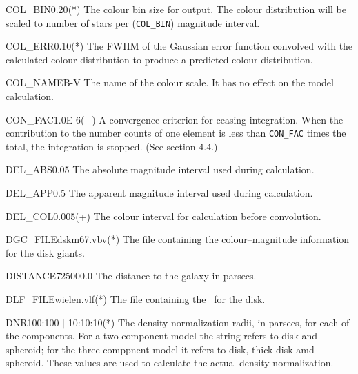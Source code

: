 \begin{key}{COL\_BIN}{0.20}{(*)}
The colour bin size for output. The colour distribution will be scaled to 
number of stars per ({\tt COL\_BIN}) magnitude interval.
\end{key}

\begin{key}{COL\_ERR}{0.10}{(*)}
The FWHM of the Gaussian error function convolved with the 
calculated colour distribution to produce a predicted colour distribution.
\end{key}

\begin{key}{COL\_NAME}{B-V}{}
The name of the colour scale. It has no effect on the model calculation.
\end{key}

\begin{key}{CON\_FAC}{1.0E-6}{(+)}
A convergence criterion for ceasing integration. When the contribution to
the number counts of one element is less than {\tt CON\_FAC} times the total, 
the integration is stopped. (See section 4.4.)
\end{key}

\begin{key}{DEL\_ABS}{0.05}{}
The absolute magnitude interval used during calculation.
\end{key}

\begin{key}{DEL\_APP}{0.5}{}
The apparent magnitude interval used during calculation.
\end{key}

\begin{key}{DEL\_COL}{0.005}{(+)}
The colour interval for calculation before convolution.
\end{key}

\begin{key}{DGC\_FILE}{dskm67.vbv}{(*)}
The file containing the colour--magnitude information for the disk giants.
\end{key}

\begin{key}{DISTANCE}{725000.0}{}
The distance to the galaxy in parsecs.
\end{key}

\begin{key}{DLF\_FILE}{wielen.vlf}{(*)}
The file containing the \lf\ for the disk.
\end{key}

\begin{key}{DNR}{100:100 $|$ 10:10:10}{(*)}
The density normalization radii, in parsecs, for each of the components. For
a two component model the string refers to disk and spheroid; for the three
comppnent model it refers to disk, thick disk amd spheroid. These values are
used to calculate the actual density normalization.
\end{key}

